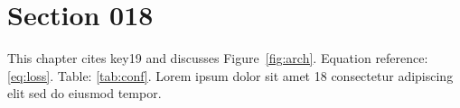 \section{Section 018}\label{sec:s18}
This chapter cites key19 and discusses Figure~\ref{fig:arch}.
Equation reference: \eqref{eq:loss}. Table: \ref{tab:conf}.
Lorem ipsum dolor sit amet 18 consectetur adipiscing elit sed do eiusmod tempor.

